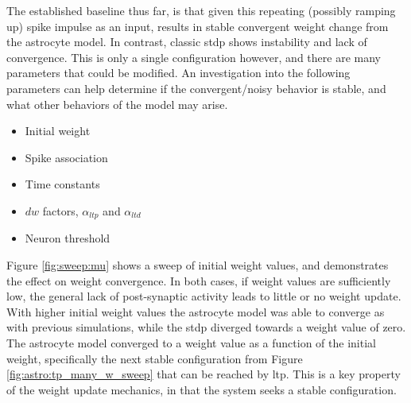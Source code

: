 

The established baseline thus far, is that given this repeating (possibly
ramping up) spike impulse as an input, results in stable convergent weight
change from the astrocyte model. In contrast, classic \gls{stdp} shows instability and
lack of convergence. This is only a single configuration however, and there are many
parameters that could be modified. An investigation into the following
parameters can help determine if the convergent/noisy behavior is stable,
and what other behaviors of the model may arise.

\begin{itemize}
\item Initial weight
\item Spike association
\item Time constants
\item $dw$ factors, $\alpha_{ltp}$ and $\alpha_{ltd}$
\item Neuron threshold
\end{itemize}

Figure \ref{fig:sweep:mu} shows a sweep of initial weight values, and
demonstrates the effect on weight convergence. In both cases, if weight values
are sufficiently low, the general lack of post-synaptic activity leads to little
or no weight update. With higher initial weight values the astrocyte model was
able to converge as with previous simulations, while the \gls{stdp} diverged towards a
weight value of zero. The astrocyte model converged to a weight value as a
function of the initial weight, specifically the next stable configuration from
Figure \ref{fig:astro:tp_many_w_sweep} that can be reached by \gls{ltp}. This is a key
property of the weight update mechanics, in that the system seeks a stable
configuration.


